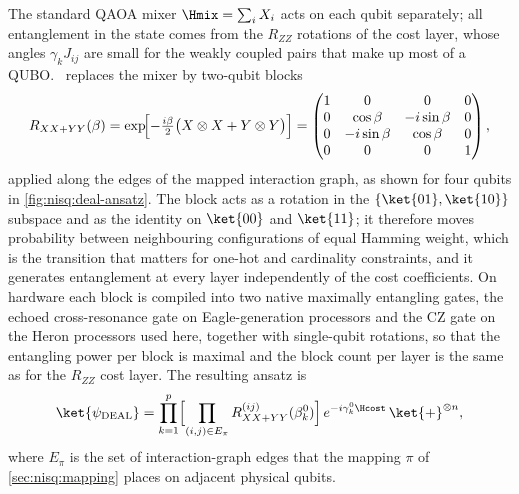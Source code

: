 The standard QAOA mixer $\Hmix=\sum_{i}X_{i}$ acts on each qubit separately; all entanglement in the state comes from the $R_{ZZ}$ rotations of the cost layer, whose angles $\gamma_{k}J_{ij}$ are small for the weakly coupled pairs that make up most of a QUBO. \deal\ replaces the mixer by two-qubit blocks
\begin{equation}\label{eq:nisq:mixer}
  R_{XX+YY}(\beta) = \exp\!\Bigl[-\tfrac{i\beta}{2}\bigl(X\otimes X + Y\otimes Y\bigr)\Bigr]
  = \begin{pmatrix} 1 & 0 & 0 & 0\\ 0 & \cos\beta & -i\sin\beta & 0\\ 0 & -i\sin\beta & \cos\beta & 0\\ 0&0&0&1\end{pmatrix},
\end{equation}
applied along the edges of the mapped interaction graph, as shown for four qubits in \cref{fig:nisq:deal-ansatz}. The block acts as a rotation in the $\{\ket{01},\ket{10}\}$ subspace and as the identity on $\ket{00}$ and $\ket{11}$; it therefore moves probability between neighbouring configurations of equal Hamming weight, which is the transition that matters for one-hot and cardinality constraints, and it generates entanglement at every layer independently of the cost coefficients. On hardware each block is compiled into two native maximally entangling gates, the echoed cross-resonance gate on Eagle-generation processors \cite{sheldon2016ecr} and the CZ gate on the Heron processors used here, together with single-qubit rotations, so that the entangling power per block is maximal and the block count per layer is the same as for the $R_{ZZ}$ cost layer. The resulting ansatz is
\begin{equation}\label{eq:nisq:deal-state}
  \ket{\psi_{\mathrm{DEAL}}} = \prod_{k=1}^{p}\Bigl[\prod_{(i,j)\in E_{\pi}} R^{(ij)}_{XX+YY}(\beta_{k}^{0})\Bigr]\, e^{-i\gamma_{k}^{0}\Hcost}\, \ket{+}^{\otimes n},
\end{equation}
where $E_{\pi}$ is the set of interaction-graph edges that the mapping $\pi$ of \cref{sec:nisq:mapping} places on adjacent physical qubits.


